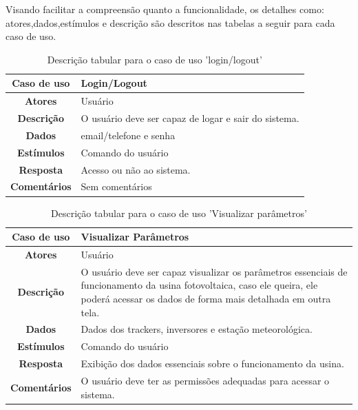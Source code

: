 \documentclass[a4paper,12pt]{article}
\begin{document}
Visando facilitar a compreensão quanto a funcionalidade, os detalhes como: atores,dados,estímulos e descrição são descritos nas tabelas a seguir para cada caso de uso.
\begin{table}[htbp]
\begin{center}
\begin{tabular}{|c|p{13cm}|}
\hline
\cellcolor{gray} \textbf{Caso de uso} &  Login/Logout\\
\hline
\cellcolor{gray} \textbf{Atores}  & Usuário \\
\hline
\cellcolor{gray} \textbf{Descrição} &   O usuário deve ser capaz de logar e sair do sistema.      \\
\hline
\cellcolor{gray} \textbf{Dados} &  email/telefone e senha \\ 
\hline
\cellcolor{gray} \textbf{Estímulos} & Comando do usuário \\
\hline
\cellcolor{gray} \textbf{Resposta} & Acesso ou não ao sistema. \\
\hline
\cellcolor{gray} \textbf{Comentários} & Sem comentários  \\
\hline
\end{tabular}
\caption{Descrição tabular para o caso de uso 'login/logout'}
\label{tab:login}
\end{center}
\end{table}


\begin{table}[htbp]
\begin{center}
\begin{tabular}{|c|p{13.2cm}|}
\hline
\cellcolor{gray} \textbf{Caso de uso} &   Visualizar Parâmetros\\
\hline
\cellcolor{gray} \textbf{Atores}  & Usuário \\
\hline
\cellcolor{gray} \textbf{Descrição} &   O usuário deve ser capaz visualizar os parâmetros essenciais de funcionamento da usina fotovoltaica, caso ele queira, ele poderá acessar os dados de forma mais detalhada em outra tela.     \\
\hline
\cellcolor{gray} \textbf{Dados} &  Dados dos trackers, inversores e estação meteorológica. \\ 
\hline
\cellcolor{gray} \textbf{Estímulos} & Comando do usuário \\
\hline
\cellcolor{gray} \textbf{Resposta} & Exibição dos dados essenciais sobre o funcionamento da usina.\\
\hline
\cellcolor{gray} \textbf{Comentários} &  O usuário deve ter as permissões adequadas para acessar o sistema.  \\
\hline
\end{tabular}
\caption{Descrição tabular para o caso de uso 'Visualizar parâmetros'}
\label{tab:visualizar_P}
\end{center}
\end{table}
\end{document}
